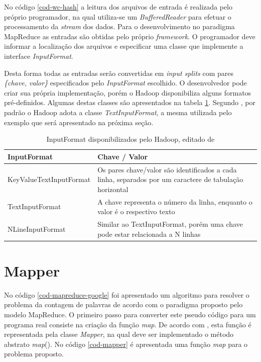 No código \ref{cod-wc-hash} a leitura dos arquivos de entrada é realizada pelo próprio programador, na qual utiliza-se um \textit{BufferedReader} para efetuar o processamento da \textit{stream} dos dados. Para o desenvolvimento no paradigma MapReduce as entradas são obtidas pelo próprio \textit{framework}. O programador deve informar a localização dos arquivos e especificar uma classe que implemente a interface \textit{InputFormat}. 

Desta forma todas as entradas serão convertidas em \textit{input splits} com pares \textit{\{chave, valor\}} especificados pelo \textit{InputFormat} escolhido. O desenvolvedor pode criar sua própria implementação, porém o Hadoop disponibiliza alguns formatos pré-definidos. Algumas destas classes são apresentados na tabela \ref{tab-inputformat}. Segundo , por padrão o Hadoop adota a classe \textit{TextInputFormat}, a mesma utilizada pelo exemplo que será apresentado na próxima seção.

\begin{table}[!ht]
\begin{center}
  \begin{tabular}{|p{5cm}|p{5cm}|}
	\hline
	InputFormat & Chave / Valor	
	\\ \hline
	KeyValueTextInputFormat & Os pares chave/valor são identificados a cada linha, separados por um caractere de tabulação horizontal
	\\ \hline
	TextInputFormat & A chave representa o número da linha, enquanto o valor é o respectivo texto
	\\ \hline
	NLineInputFormat & Similar ao TextInputFormat, porém uma chave pode estar relacionada a N linhas
	\\ \hline
  \end{tabular}
  \caption{InputFormat disponibilizados pelo Hadoop, editado de 
  }
\label{tab-inputformat}
\end{center}
\end{table}
\FloatBarrier

\section{Mapper}

No código \ref{cod-mapreduce-google} foi apresentado um algoritmo para resolver o problema da contagem de palavras de acordo com o paradigma proposto pelo modelo MapReduce. O primeiro passo para converter este pseudo código para um programa real consiste na criação da função \textit{map}. De acordo com , esta função é representada pela classe \textit{Mapper}, na qual deve ser implementado o método abstrato \textit{map}(). No código \ref{cod-mapper} é apresentada uma função \textit{map} para o problema proposto.

